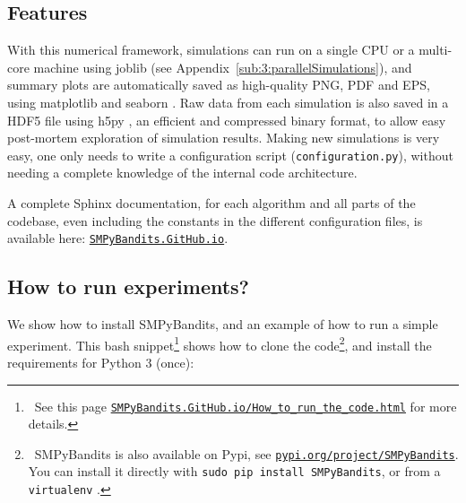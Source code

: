 \begin{small}
    \inputminted[linenos=true,numbersep=5pt,frame=lines,framesep=2mm]{python3}{2-Chapters/3-Chapter/src/example_of_a_IndexPolicy_UCB.py}
\end{small}


\subsection{Features}

With this numerical framework, simulations can run on a single CPU or a multi-core machine using joblib \cite{joblib} (see Appendix~\ref{sub:3:parallelSimulations}),
and summary plots are automatically saved as high-quality PNG, PDF and EPS, using matplotlib \cite{matplotlib} and seaborn \cite{seaborn}.
Raw data from each simulation is also saved in a HDF5 file using h5py \cite{h5py}, an efficient and compressed binary format, to allow easy post-mortem exploration of simulation results.
Making new simulations is very easy, one only needs to write a configuration script (\texttt{configuration.py}), without needing a complete knowledge of the internal code architecture.

A complete Sphinx documentation, for each algorithm and all parts of the codebase, even including the constants in the different configuration files, is available here:
\texttt{\href{https://SMPyBandits.GitHub.io}{SMPyBandits.GitHub.io}}.


\subsection{How to run experiments?}

We show how to install SMPyBandits, and an example of how to run a simple experiment.
This bash snippet\footnote{~See this page \texttt{\href{https://SMPyBandits.GitHub.io/How_to_run_the_code.html}{SMPyBandits.GitHub.io/How\_to\_run\_the\_code.html}} for more details.} shows how to clone the code\footnote{~SMPyBandits is also available on Pypi, see \texttt{\href{https://pypi.org/project/SMPyBandits/}{pypi.org/project/SMPyBandits}}. You can install it directly with \texttt{sudo pip install SMPyBandits}, or from a \texttt{virtualenv} \cite{virtualenv}.},
and install the requirements for Python 3 (once):

